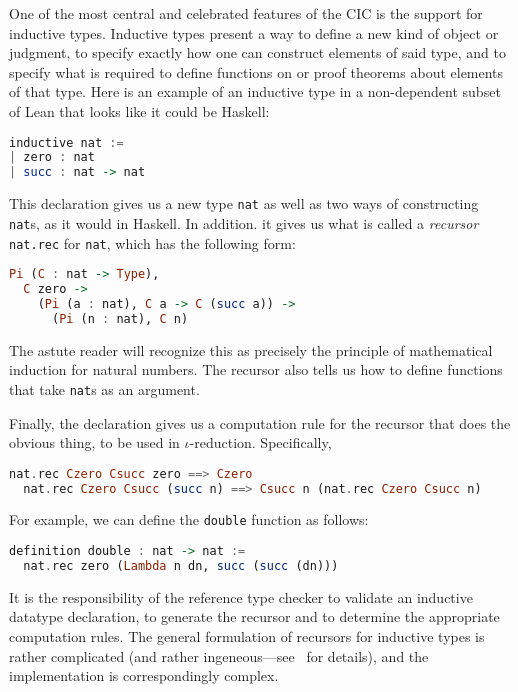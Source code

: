 \documentclass{article}
\begin{document}
\begin{spacing}{1.1}
One of the most central and celebrated features of the CIC is the support for inductive types. Inductive types present a way to define a new kind of object or judgment, to specify exactly how one can construct elements of said type, and to specify what is required to define functions on or proof theorems about elements of that type. Here is an example of an inductive type in a non-dependent subset of Lean that looks like it could be Haskell:

\begin{lstlisting}[language=Haskell]
inductive nat :=
| zero : nat
| succ : nat -> nat
\end{lstlisting}

This declaration gives us a new type \lstinline{nat} as well as two ways of constructing \lstinline{nat}s, as it would in Haskell. In addition. it gives us what is called a \emph{recursor} \lstinline{nat.rec} for \lstinline{nat}, which has the following form:
\begin{lstlisting}[language=Haskell]
Pi (C : nat -> Type),
  C zero ->
    (Pi (a : nat), C a -> C (succ a)) ->
      (Pi (n : nat), C n)
\end{lstlisting}
The astute reader will recognize this as precisely the principle of mathematical induction for natural numbers. The recursor also tells us how to define functions that take \lstinline{nat}s as an argument.

Finally, the declaration gives us a computation rule for the recursor that does the obvious thing, to be used in \( \iota \)-reduction. Specifically,
\begin{lstlisting}[language=Haskell]
  nat.rec Czero Csucc zero ==> Czero
  nat.rec Czero Csucc (succ n) ==> Csucc n (nat.rec Czero Csucc n)
\end{lstlisting}

For example, we can define the \lstinline{double} function as follows:
\begin{lstlisting}[language=Haskell]
definition double : nat -> nat :=
  nat.rec zero (Lambda n dn, succ (succ (dn)))
\end{lstlisting}

It is the responsibility of the reference type checker to validate an inductive datatype declaration, to generate the recursor and to determine the appropriate computation rules. The general formulation of recursors for inductive types is rather complicated (and rather ingeneous---see~\cite{dybjer1994inductive} for details), and the implementation is correspondingly complex.


\end{spacing}
\end{document}
